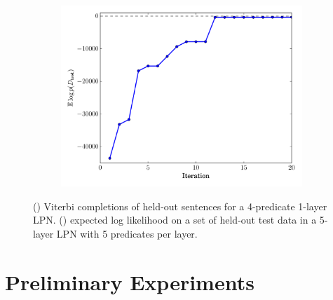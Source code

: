 \documentclass{article} %
\begin{document}
\begin{figure}
\begin{subfigure}{0.45\linewidth}
\begin{tabular}{>{\footnotesize} l >{\footnotesize} l >{\footnotesize} l}
      \end{tabular}
      \caption{}
      \label{tab:results}
  \end{subfigure}
  \hfill
  \begin{subfigure}[c]{0.50\linewidth}
    \vspace{1em}
    \includegraphics[width=\linewidth]{figures/train_number_net_0006_held_out.pdf}
    \caption{}
    \label{fig:heldoutLL}
  \end{subfigure}
  \caption{() Viterbi completions of held-out sentences for a 4-predicate 1-layer LPN. () expected log likelihood on a set of held-out test data in a 5-layer LPN with 5 predicates per layer.}
\end{figure}

\section{Preliminary Experiments}
\end{document}
